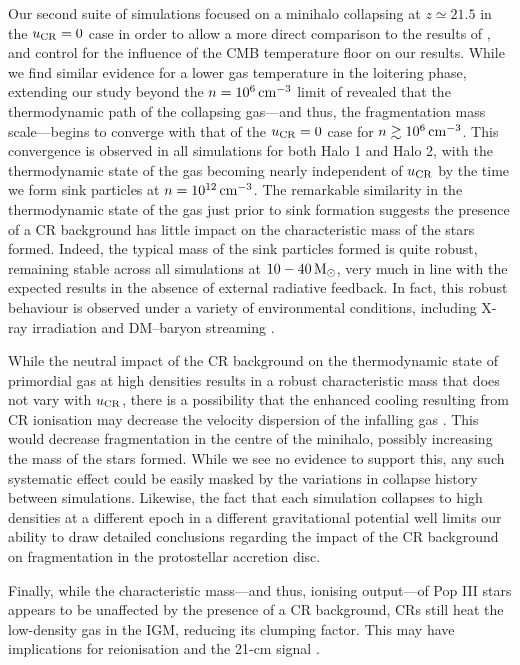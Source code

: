 \documentclass[usenatbib]{mn2e}
\newcommand{\cc}{\,{\rm cm}^{-3}}
\newcommand{\msun}{\,{\rm M}_{\odot}}
\newcommand{\ucr}{{u}_{\rm \small CR}}
\begin{document}
Our second suite of simulations focused on a minihalo collapsing at $z\simeq21.5$ in the $\ucr=0$ case in order to allow a more direct comparison to the results of \citet{StacyBromm2007}, and control for the influence of the CMB temperature floor on our results.
While we find similar evidence for a lower gas temperature in the loitering phase, extending our study beyond the $n=10^6\cc$ limit of \citet{StacyBromm2007} revealed that the thermodynamic path of the collapsing gas---and thus, the fragmentation mass scale---begins to converge with that of the $\ucr=0$ case for $n\gtrsim10^6\cc$.  
This convergence is observed in all simulations for both Halo 1 and Halo 2, with the thermodynamic state of the gas becoming nearly independent of $\ucr$ by the time we form sink particles at $n=10^{12}\cc$.
The remarkable similarity in the thermodynamic state of the gas just prior to sink formation suggests the presence of a CR background has little impact on the characteristic mass of the stars formed.  
Indeed, the typical mass of the sink particles formed is quite robust, remaining stable across all simulations at $10-40\msun$, very much in line with the expected results in the absence of external radiative feedback. In fact, this robust behaviour is observed under a variety of environmental conditions, including X-ray irradiation \citep{Hummeletal2015} and DM--baryon streaming \citep{StacyBrommLoeb2011a,Greifetal2011b}.

While the neutral impact of the CR background on the thermodynamic state of primordial gas at high densities results in a robust characteristic mass that does not vary with $\ucr$, there is a possibility that the enhanced cooling resulting from CR ionisation may decrease the velocity dispersion of the infalling gas \citep{Clarketal2011a}.  
This would decrease fragmentation in the centre of the minihalo, possibly increasing the mass of the stars formed.
While we see no evidence to support this, any such systematic effect could be easily masked by the variations in collapse history between simulations.  
Likewise, the fact that each simulation collapses to high densities at a different epoch in a different gravitational potential well limits our ability to draw detailed conclusions regarding the impact of the CR background on fragmentation in the protostellar accretion disc.

Finally, while the characteristic mass---and thus, ionising output---of Pop III stars appears to be unaffected by the presence of a CR background, CRs still heat the low-density gas in the IGM, reducing its clumping factor. This may have implications for reionisation and the 21-cm signal \citep{FurlanettoPengBriggs2006, SazonovSunyaev2015}.
\end{document}
